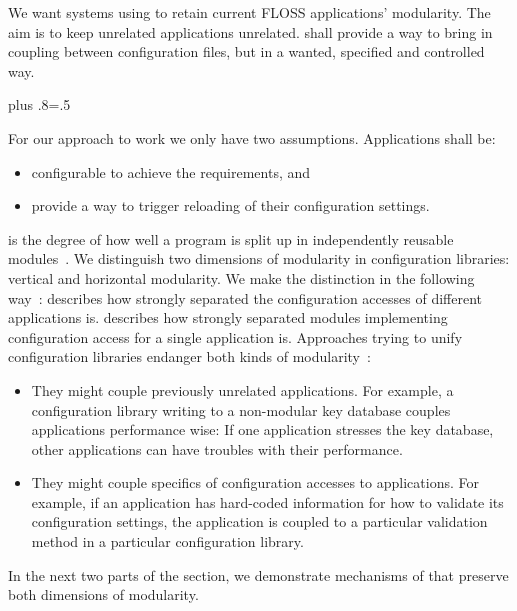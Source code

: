 We want systems using \elektra{} to retain current FLOSS applications' modularity.
The aim is to keep unrelated applications unrelated.
 shall provide a way to bring in coupling between configuration files, but in a wanted, specified and controlled way.%
{\parfillskip=0pt plus .8\textwidth \emergencystretch=.5\textwidth \par}

For our approach to work we only have two assumptions.
Applications shall be:

\begin{itemize}
\item configurable to achieve the requirements, and
\item provide a way to trigger reloading of their configuration settings.
\end{itemize}


 is the degree of how well a program is split up in independently reusable modules~\cite{assmann2003invasive}.
We distinguish two dimensions of modularity in configuration libraries:
vertical and horizontal modularity.
We make the distinction in the following way~\cite{raab2016improving}:
 describes how strongly separated the configuration accesses of different applications is.
 describes how strongly separated modules implementing configuration access for a single application is.
Approaches trying to unify configuration libraries endanger both kinds of modularity~\cite{raab2016improving}:
\begin{itemize}
\item They might couple previously unrelated applications.
For example, a configuration library writing to a non-modular key database couples applications performance wise:
If one application stresses the key database, other applications can have troubles with their performance.

\item They might couple specifics of configuration accesses to applications.
For example, if an application has hard-coded information for how to validate its configuration settings, the application is coupled to a particular validation method in a particular configuration library.
\end{itemize}
In the next two parts of the section, we demonstrate mechanisms of  that preserve both dimensions of modularity.



